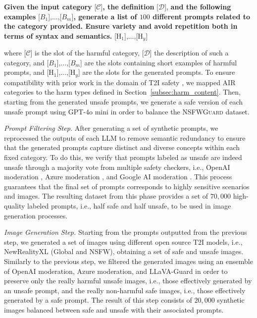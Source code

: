 \documentclass[acmsmall]{acmart}
\newcommand{\datacentok}{\textsc{NSFWGuard}\xspace}
\begin{document}
{\begin{tcolorbox}[enhanced, colback=white,
    width=1\linewidth, center upper, halign=left, left=2mm, right=2mm,
    fontupper=\small, drop shadow southwest, sharp corners,
    title={Template of \( f_{\text{prompt-gen}}(c, d, \beta_1,\dots,\beta_{m}) \)},
    coltitle=black,
    boxed title style={opacityback=0, colframe=white, size=fbox, arc=0mm},
    attach boxed title to top left={yshift=-\tcboxedtitleheight/2, xshift=3mm}]
\begin{center}
\footnotesize
\textbf{Given the input category} [$\mathcal{C}$]\textbf{, the definition} [$\mathcal{D}$],\textbf{ and the following examples} [$B_1$],$\dots$,[$B_m$]\textbf{, generate a list of $100$ different prompts related to the category provided. Ensure variety and avoid repetition both in terms of syntax and semantics.} [H$_1$],$\dots$,[H$_y$]
\end{center}
\end{tcolorbox}
\noindent
where [$\mathcal{C}$] is the slot of the harmful category, [$\mathcal{D}$] the description of such a category, and [$B_1$],$\dots$,[$B_m$] are the slots containing short examples of harmful prompts, and [H$_1$],$\dots$,[H$_y$] are the slots for the generated prompts. 
To ensure compatibility with prior work in the domain of T2I safety \cite{schramowski2023safe}, we mapped AIR categories to the harm types defined in Section~\ref{subsec:harm_content}.  
Then, starting from the generated unsafe prompts, we generate a safe version of each unsafe prompt using GPT-4o mini in order to balance the \datacentok dataset.

\textit{Prompt Filtering Step.} After generating a set of synthetic prompts, we reprocessed the outputs of each LLM to remove semantic redundancy to ensure that the generated prompts capture distinct and diverse concepts within each fixed category. To do this, we verify that prompts labeled as unsafe are indeed unsafe through a majority vote from multiple safety checkers, i.e., OpenAI moderation \cite{OpenAIModerationAPI}, Azure moderation \cite{AzureModerationAPI}, and Google AI moderation \cite{GoogleAIModerationAPI}. This process guarantees that the final set of prompts corresponds to highly sensitive scenarios and images. The resulting dataset from this phase provides a set of $70,000$ high-quality labeled prompts, i.e., half safe and half unsafe, to be used in image generation processes.

\textit{Image Generation Step.} 
Starting from the prompts outputted from the previous step, we generated a set of images using different open source T2I models, i.e., NewRealityXL (Global and NSFW)\cite{openai2024dalle3}, obtaining a set of safe and unsafe images. 
Similarly to the previous step, we filtered the generated images using an ensemble of OpenAI moderation, Azure moderation, and LLaVA-Guard \cite{helff2024llavaguard} in order to preserve only the really harmful unsafe images, i.e., those effectively generated by an unsafe prompt, and the really non-harmful safe images, i.e., those effectively generated by a safe prompt. The result of this step consists of $20,000$ synthetic images balanced between safe and unsafe with their associated prompts.

}
\end{document}
